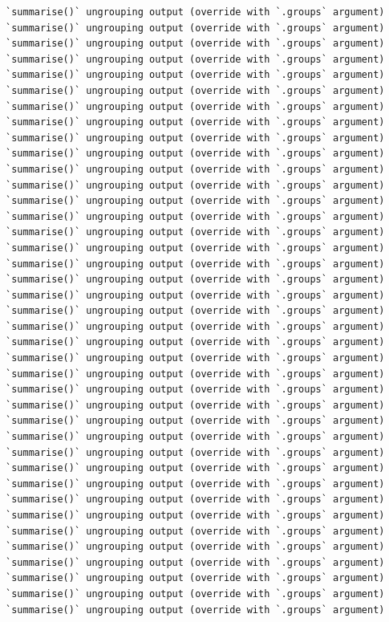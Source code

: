 \documentclass[
]{book}
\begin{document}
\begin{verbatim}
`summarise()` ungrouping output (override with `.groups` argument)
`summarise()` ungrouping output (override with `.groups` argument)
`summarise()` ungrouping output (override with `.groups` argument)
`summarise()` ungrouping output (override with `.groups` argument)
`summarise()` ungrouping output (override with `.groups` argument)
`summarise()` ungrouping output (override with `.groups` argument)
`summarise()` ungrouping output (override with `.groups` argument)
`summarise()` ungrouping output (override with `.groups` argument)
`summarise()` ungrouping output (override with `.groups` argument)
`summarise()` ungrouping output (override with `.groups` argument)
`summarise()` ungrouping output (override with `.groups` argument)
`summarise()` ungrouping output (override with `.groups` argument)
`summarise()` ungrouping output (override with `.groups` argument)
`summarise()` ungrouping output (override with `.groups` argument)
`summarise()` ungrouping output (override with `.groups` argument)
`summarise()` ungrouping output (override with `.groups` argument)
`summarise()` ungrouping output (override with `.groups` argument)
`summarise()` ungrouping output (override with `.groups` argument)
`summarise()` ungrouping output (override with `.groups` argument)
`summarise()` ungrouping output (override with `.groups` argument)
`summarise()` ungrouping output (override with `.groups` argument)
`summarise()` ungrouping output (override with `.groups` argument)
`summarise()` ungrouping output (override with `.groups` argument)
`summarise()` ungrouping output (override with `.groups` argument)
`summarise()` ungrouping output (override with `.groups` argument)
`summarise()` ungrouping output (override with `.groups` argument)
`summarise()` ungrouping output (override with `.groups` argument)
`summarise()` ungrouping output (override with `.groups` argument)
`summarise()` ungrouping output (override with `.groups` argument)
`summarise()` ungrouping output (override with `.groups` argument)
`summarise()` ungrouping output (override with `.groups` argument)
`summarise()` ungrouping output (override with `.groups` argument)
`summarise()` ungrouping output (override with `.groups` argument)
`summarise()` ungrouping output (override with `.groups` argument)
`summarise()` ungrouping output (override with `.groups` argument)
`summarise()` ungrouping output (override with `.groups` argument)
`summarise()` ungrouping output (override with `.groups` argument)
`summarise()` ungrouping output (override with `.groups` argument)
`summarise()` ungrouping output (override with `.groups` argument)

\end{verbatim}
\end{document}
